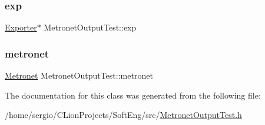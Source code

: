 \subsubsection{\texorpdfstring{exp}{exp}}
{\footnotesize\ttfamily \hyperlink{class_exporter}{Exporter}$\ast$ Metronet\+Output\+Test\+::exp\hspace{0.3cm}{\ttfamily [protected]}}

\mbox{\label{class_metronet_output_test_aaa6f34ee762d128cd8aea8c895bb46e4}} 
\subsubsection{\texorpdfstring{metronet}{metronet}}
{\footnotesize\ttfamily \hyperlink{class_metronet}{Metronet} Metronet\+Output\+Test\+::metronet\hspace{0.3cm}{\ttfamily [protected]}}



The documentation for this class was generated from the following file\+:\begin{DoxyCompactItemize}
\item 
/home/sergio/\+C\+Lion\+Projects/\+Soft\+Eng/src/\hyperlink{_metronet_output_test_8h}{Metronet\+Output\+Test.\+h}\end{DoxyCompactItemize}
